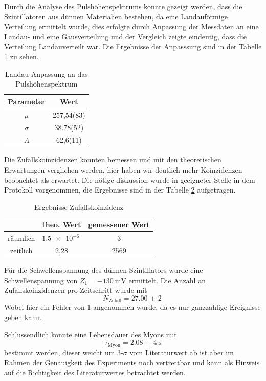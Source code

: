 \documentclass{article}
\begin{document}
Durch die Analyse des Pulshöhenspektrums konnte gezeigt werden, dass die Szintillatoren aus dünnen Materialien bestehen, da eine Landauförmige Verteilung ermittelt wurde, dies erfolgte durch Anpassung der Messdaten an eine
Landau- und eine Gausverteilung und der Vergleich zeigte eindeutig, dass die Verteilung Landauverteilt war. Die Ergebnisse der Anpasssung sind in der Tabelle \ref{tab:LandauAnpassungPulshoheFazit} zu sehen.
\begin{table}[H]
    \centering
    \caption{Landau-Anpassung an das Pulshöhenspektrum}
    \begin{tabular}{|c|c|}
        \hline
        Parameter & Wert \\ \hline \hline
        $\mu$ & 257,54(83) \\ \hline
        $\sigma$ & 38.78(52) \\ \hline
        $A$ & 62,6(11) \\ \hline
    \end{tabular}
    \label{tab:LandauAnpassungPulshoheFazit}
\end{table}

Die Zufallskoinzidenzen konnten bemessen und mit den theoretischen Erwartungen verglichen werden, hier haben wir deutlich mehr Koinzidenzen beobachtet als erwartet. Die nötige diskussion wurde in geeigneter Stelle in dem 
Protokoll vorgenommen, die Ergebnisse sind in der Tabelle \ref{tab:ZufallskoinzidenzFazit} aufgetragen.
\begin{table}[H]
    \centering
    \caption{Ergebnisse Zufallskoinzidenz}
    \begin{tabular}{|c|c|c|}
        \hline
        & theo. Wert & gemessener Wert \\ \hline \hline
        räumlich & $\SI{1,5e-6}{}$ & 3 \\ \hline
        zeitlich & 2,28 & 2569 \\ \hline
    \end{tabular}
    \label{tab:ZufallskoinzidenzFazit}
\end{table}

Für die Schwellenspannung des dünnen Szintillators wurde eine Schwellenspannung von $Z_1=\SI{-130}{\milli\volt}$ ermittelt.
Die Anzahl an Zufallskoinzidenzen pro Zeitschritt wurde mit 
\begin{displaymath}
    N_\text{Zufall}=\SI{27,00(2)}{}
\end{displaymath}
Wobei hier ein Fehler von 1 angenommen wurde, da es nur ganzzahlige Ereignisse geben kann.

Schlussendlich konnte eine Lebensdauer des Myons mit 
\begin{displaymath}
    \tau_\text{Myon}=\SI{2,08(4)}{\second}
\end{displaymath}
bestimmt werden, dieser weicht um $3$-$\sigma$ vom Literaturwert ab ist aber im Rahmen der Genauigkeit des Experiments noch vertrettbar und kann als Hinweis auf die Richtigkeit des Literaturwertes betrachtet werden.
\end{document}
